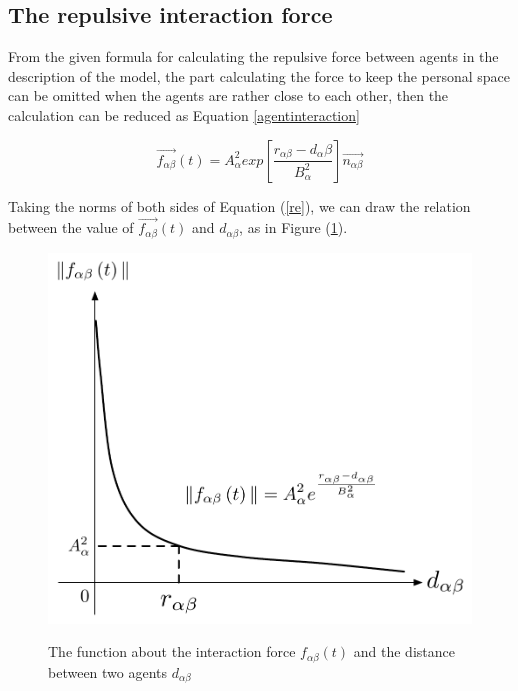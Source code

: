 \subsection{The repulsive interaction force}
From the given formula for calculating the repulsive force between agents in 
the description of the model, the part calculating the force to keep the 
personal space can be omitted when the agents are rather close to each other, 
then the calculation can be reduced as Equation \eqref{agentinteraction}

\begin{equation}\label{re}
\overrightarrow{f_{\alpha\beta}}(t) = A_{\alpha}^{2} exp\left[ \frac{r_{\alpha\beta} - d_{\alpha}\beta}{B_{\alpha}^{2}}\right]  \overrightarrow{n_{\alpha\beta}}
\end{equation}

Taking the norms of both sides of Equation (\ref{re}), we can draw the 
relation between the value of $\overrightarrow{f_{\alpha\beta}}(t)$ and $ d_{\alpha\beta} $, as in Figure (\ref{physicalinteraction}).\\

\begin{figure}
    \centering
    {\includegraphics[scale=0.45]{Figures/physicalinteraction.pdf}} 
    \caption{The function about the interaction force 
        $f_{\alpha\beta}(t)$ and the distance between two agents
        $d_{\alpha \beta}$ }
    \label{physicalinteraction}
\end{figure}

